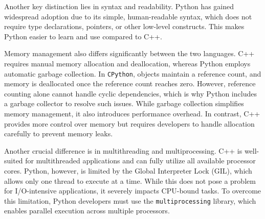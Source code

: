 Another key distinction lies in syntax and readability. Python has gained widespread adoption due to its simple, human-readable syntax, which does not require type declarations, pointers, or other low-level constructs. This makes Python easier to learn and use compared to C++.

Memory management also differs significantly between the two languages. C++ requires manual memory allocation and deallocation, whereas Python employs automatic garbage collection. In \texttt{CPython}, objects maintain a reference count, and memory is deallocated once the reference count reaches zero. However, reference counting alone cannot handle cyclic dependencies, which is why Python includes a garbage collector to resolve such issues. While garbage collection simplifies memory management, it also introduces performance overhead\parencite{python-gc}. In contrast, C++ provides more control over memory but requires developers to handle allocation carefully to prevent memory leaks.

Another crucial difference is in multithreading and multiprocessing. C++ is well-suited for multithreaded applications and can fully utilize all available processor cores. Python, however, is limited by the Global Interpreter Lock (GIL), which allows only one thread to execute at a time. While this does not pose a problem for \ac{I/O}-intensive applications, it severely impacts CPU-bound tasks. To overcome this limitation, Python developers must use the \texttt{multiprocessing} library, which enables parallel execution across multiple processors\parencite{python-threading}.

\printbibliography
